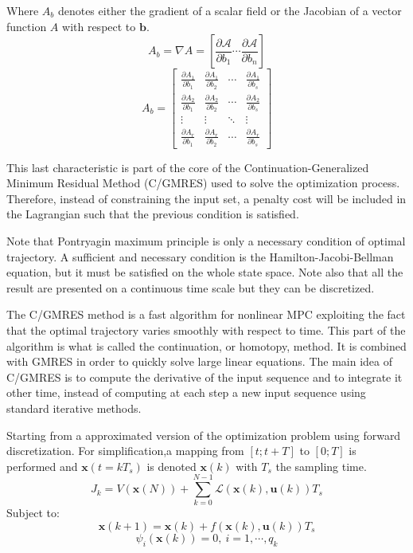 \documentclass[a4paper, 12pt]{report}
\begin{document}
Where $A_b$ denotes either the gradient of a scalar field or the Jacobian of a vector function $A$ with respect to $\boldsymbol{b}$.
\[ A_b = \nabla A = \left [ \frac{\partial \mathcal{A}}{\partial b_1} \cdots \frac{\partial \mathcal{A}}{\partial b_n} \right ] \]
\[ A_b =  \begin{bmatrix} \frac{\partial A_1}{\partial b_1} & \frac{\partial A_1}{\partial b_2} & \cdots & \frac{\partial A_1}{\partial b_s}  \\ 
 \frac{\partial A_2}{\partial b_1} &  \frac{\partial A_2}{\partial b_2} & \cdots & \frac{\partial A_2}{\partial b_s}  \\ 
 \vdots &  \vdots & \ddots & \vdots  \\ 
 \frac{\partial A_r}{\partial b_1} &  \frac{\partial A_r}{\partial b_2} & \cdots & \frac{\partial A_r}{\partial b_s} \end{bmatrix}  \]

This last characteristic is part of the core of the Continuation-Generalized Minimum Residual Method (C/GMRES)\cite{Ohtsuka2004} used to solve the optimization process. Therefore, instead of constraining the input set, a penalty cost will be included in the Lagrangian such that the previous condition is satisfied.

Note that Pontryagin maximum principle is only a necessary condition of optimal trajectory. A sufficient and necessary condition is the Hamilton-Jacobi-Bellman equation, but it must be satisfied on the whole state space. Note also that all the result are presented on a continuous time scale but they can be discretized.

The C/GMRES method is a fast algorithm for nonlinear MPC exploiting the fact that the optimal trajectory varies smoothly with respect to time. This part of the algorithm is what is called the continuation, or homotopy, method. It is combined with GMRES in order to quickly solve large linear equations. The main idea of C/GMRES is to compute the derivative of the input sequence and to integrate it other time, instead of computing at each step a new input sequence using standard iterative methods.

Starting from a approximated version of the optimization problem using forward discretization. For simplification,a mapping from $[t; t+T]$ to $[0; T]$ is performed and $\boldsymbol{x}(t = kT_s)$ is denoted $\boldsymbol{x}(k)$ with $T_s$ the sampling time.
\[ J_k = V(\boldsymbol{x}(N)) + \sum_{k = 0}^{N-1} \mathcal{L}(\boldsymbol{x}(k), \boldsymbol{u}(k))T_s \]
Subject to:
\[ \boldsymbol{x}(k+1) = \boldsymbol{x}(k) + f(\boldsymbol{x}(k),\boldsymbol{u}(k))T_s \]
\[ \psi_i(\boldsymbol{x}(k)) = 0,\ i = 1, \cdots, q_k \]
\end{document}
